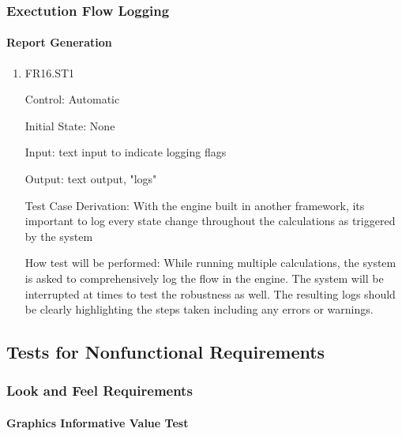 \documentclass[12pt, titlepage]{article}
\begin{document}
\subsubsection{Exectution Flow Logging}

\paragraph{Report Generation}

\begin{enumerate}

\item{FR16.ST1\\}

Control: Automatic
					
Initial State: None
					
Input: text input to indicate logging flags 
					
Output: text output, "logs"

Test Case Derivation: With the engine built in another framework, its important to log every state change throughout the calculations as triggered by the system

How test will be performed: While running multiple calculations, the system is asked to comprehensively log the flow in the engine. The system will be interrupted at times to test the robustness as well. The resulting logs should be clearly highlighting the steps taken including any errors or warnings.
					
\end{enumerate}

\subsection{Tests for Nonfunctional Requirements}



\subsubsection{Look and Feel Requirements}
		
\paragraph{Graphics Informative Value Test}
\end{document}
